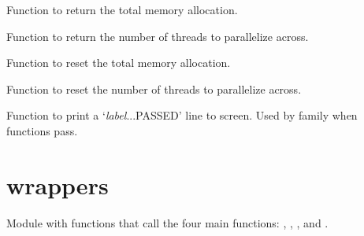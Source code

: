 \documentclass[letterpaper,10pt,english]{sphinxmanual}
\begin{document}

\begin{fulllineitems}
\label{index:util.get_memory}
Function to return the total memory allocation.

\end{fulllineitems}


\begin{fulllineitems}
\label{index:util.get_num_threads}
Function to return the number of threads to parallelize across.

\end{fulllineitems}


\begin{fulllineitems}
\label{index:util.set_memory}
Function to reset the total memory allocation.

\end{fulllineitems}


\begin{fulllineitems}
\label{index:util.set_num_threads}
Function to reset the number of threads to parallelize across.

\end{fulllineitems}


\begin{fulllineitems}
\label{index:util.success}
Function to print a `\emph{label}...PASSED' line to screen.
Used by {\hyperref[index:util.compare_values]{}} family when functions pass.

\end{fulllineitems}



\section{wrappers}
\label{index:wrappers}\label{index:module-wrappers}
Module with functions that call the four main {\hyperref[index:module-driver]{}}
functions: {\hyperref[index:driver.energy]{}}, {\hyperref[index:driver.optimize]{}},
{\hyperref[index:driver.response]{}}, and {\hyperref[index:driver.frequency]{}}.
\end{document}
